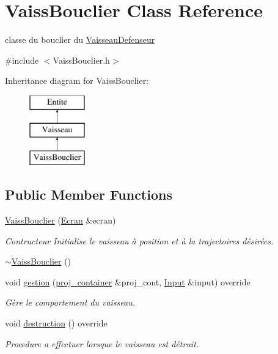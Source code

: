 \hypertarget{class_vaiss_bouclier}{}\section{Vaiss\+Bouclier Class Reference}
\label{class_vaiss_bouclier}


classe du bouclier du \mbox{\hyperlink{class_vaisseau_defenseur}{Vaisseau\+Defenseur}}  




{\ttfamily \#include $<$Vaiss\+Bouclier.\+h$>$}

Inheritance diagram for Vaiss\+Bouclier\+:\begin{figure}[H]
\begin{center}
\leavevmode
\includegraphics[height=3.000000cm]{class_vaiss_bouclier}
\end{center}
\end{figure}
\subsection*{Public Member Functions}
\begin{DoxyCompactItemize}
\item 
\mbox{\hyperlink{class_vaiss_bouclier_a55a735a46a8a469d16b777aa6f05f694}{Vaiss\+Bouclier}} (\mbox{\hyperlink{class_ecran}{Ecran}} \&ecran)
\begin{DoxyCompactList}\small\item\em Contructeur Initialise le vaisseau à position et à la trajectoires désirées. \end{DoxyCompactList}\item 
\mbox{\hyperlink{class_vaiss_bouclier_a65dd3334ff154c6e9168b327e617523f}{$\sim$\+Vaiss\+Bouclier}} ()
\item 
void \mbox{\hyperlink{class_vaiss_bouclier_a03ba45dff79711b32db64d01ab7ff90b}{gestion}} (\mbox{\hyperlink{def__type_8h_a87980cd8ee9533e561a73e8bbc728188}{proj\+\_\+container}} \&proj\+\_\+cont, \mbox{\hyperlink{_input_8h_a5588d60d674991c719a8df848313e966}{Input}} \&input) override
\begin{DoxyCompactList}\small\item\em Gère le comportement du vaisseau. \end{DoxyCompactList}\item 
void \mbox{\hyperlink{class_vaiss_bouclier_ab154712cec76a589fd8bce2392982c5b}{destruction}} () override
\begin{DoxyCompactList}\small\item\em Procedure a effectuer lorsque le vaisseau est détruit. \end{DoxyCompactList}\end{DoxyCompactItemize}
